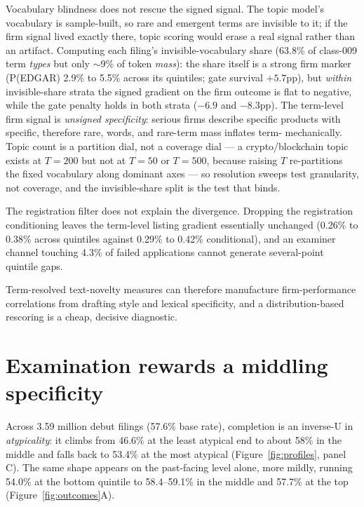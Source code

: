 Vocabulary blindness does not rescue the signed signal. The topic
model's vocabulary is sample-built, so rare and emergent terms are
invisible to it; if the firm signal lived exactly there, topic scoring
would erase a real signal rather than an artifact. Computing each
filing's invisible-vocabulary share (63.8\% of class-009 term
\emph{types} but only $\sim$9\% of token \emph{mass}): the share itself
is a strong firm marker (P(EDGAR) 2.9\% to 5.5\% across its quintiles;
gate survival $+5.7$pp), but \emph{within} invisible-share strata the
signed \dkl{} gradient on the firm outcome is flat to negative, while
the gate penalty holds in both strata ($-6.9$ and $-8.3$pp). The
term-level firm signal is \emph{unsigned specificity}: serious firms
describe specific products with specific, therefore rare, words, and
rare-term mass inflates term-\dkl{} mechanically. Topic count is a
partition dial, not a coverage dial --- a crypto/blockchain topic exists
at $T = 200$ but not at $T = 50$ or $T = 500$, because raising $T$
re-partitions the fixed vocabulary along dominant axes --- so resolution
sweeps test granularity, not coverage, and the invisible-share split is
the test that binds.

The registration filter does not explain the divergence. Dropping the
registration conditioning leaves the term-level listing gradient
essentially unchanged (0.26\% to 0.38\% across quintiles against 0.29\%
to 0.42\% conditional), and an examiner channel touching 4.3\% of failed
applications cannot generate several-point quintile gaps.

Term-resolved text-novelty measures can therefore manufacture
firm-performance correlations from drafting style and lexical specificity,
and a distribution-based rescoring is a cheap, decisive diagnostic.

\section{Examination rewards a middling specificity}\label{app:registration}

Across 3.59 million debut filings (57.6\% base rate), completion is an
inverse-U in \emph{atypicality}: it climbs from 46.6\% at the least atypical
end to about 58\% in the middle and falls back to 53.4\% at the most atypical
(Figure~\ref{fig:profiles}, panel C). The same shape appears on the
past-facing level alone, more mildly, running 54.0\% at the bottom quintile to
58.4--59.1\% in the middle and 57.7\% at the top (Figure~\ref{fig:outcomes}A).

